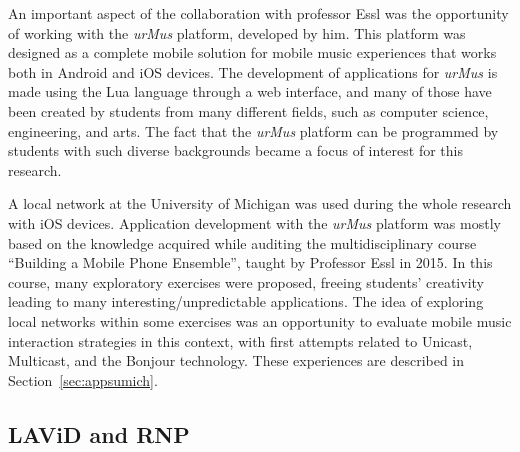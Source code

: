 An important aspect of the collaboration with professor Essl was the opportunity of working with the \textit{urMus} platform, developed by him.
This platform was designed as a complete mobile solution for mobile music experiences that works both in Android and iOS devices.
The development of applications for \textit{urMus} is made using the Lua language through a web interface, and many of those have been created by students from many different fields, such as computer science, engineering, and arts. The fact that the \textit{urMus} platform can be programmed by students with such diverse backgrounds became a focus of interest for this research. 
%


A local network at the University of Michigan was used during the whole research with iOS devices.
Application development with the \textit{urMus} platform was mostly based on the knowledge acquired while auditing the multidisciplinary course ``Building a Mobile Phone Ensemble'', taught by Professor Essl in 2015.
In this course, many exploratory exercises were proposed, freeing students' creativity leading to many interesting/unpredictable applications.
The idea of exploring local networks within some exercises was an opportunity to evaluate mobile music interaction strategies in this context, with first attempts related to Unicast, Multicast, and the Bonjour technology.
These experiences are described in Section~\ref{sec:appsumich}. 

\subsection*{LAViD and RNP}

